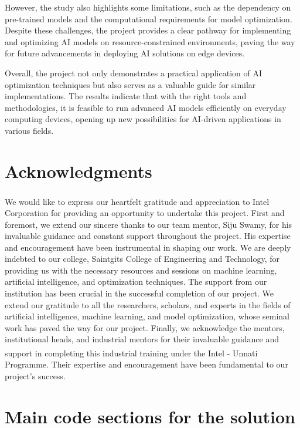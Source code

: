 \documentclass{josis}
\begin{document}
However, the study also highlights some limitations, such as the dependency on pre-trained models and the computational requirements for model optimization. Despite these challenges, the project provides a clear pathway for implementing and optimizing AI models on resource-constrained environments, paving the way for future advancements in deploying AI solutions on edge devices.

Overall, the project not only demonstrates a practical application of AI optimization techniques but also serves as a valuable guide for similar implementations. The results indicate that with the right tools and methodologies, it is feasible to run advanced AI models efficiently on everyday computing devices, opening up new possibilities for AI-driven applications in various fields.

\section{Acknowledgments}

We would like to express our heartfelt gratitude and appreciation to Intel\textsuperscript{\textcopyright} Corporation for providing an opportunity to undertake this project. First and foremost, we extend our sincere thanks to our team mentor, Siju Swamy, for his invaluable guidance and constant support throughout the project. His expertise and encouragement have been instrumental in shaping our work. We are deeply indebted to our college, Saintgits College of Engineering and Technology, for providing us with the necessary resources and sessions on machine learning, artificial intelligence, and optimization techniques. The support from our institution has been crucial in the successful completion of our project. We extend our gratitude to all the researchers, scholars, and experts in the fields of artificial intelligence, machine learning, and model optimization, whose seminal work has paved the way for our project. Finally, we acknowledge the mentors, institutional heads, and industrial mentors for their invaluable guidance and support in completing this industrial training under the Intel\textsuperscript{\textcopyright} - Unnati Programme. Their expertise and encouragement have been fundamental to our project's success.
\cite{*}


\appendix

\section{Main code sections for the solution}
\end{document}
